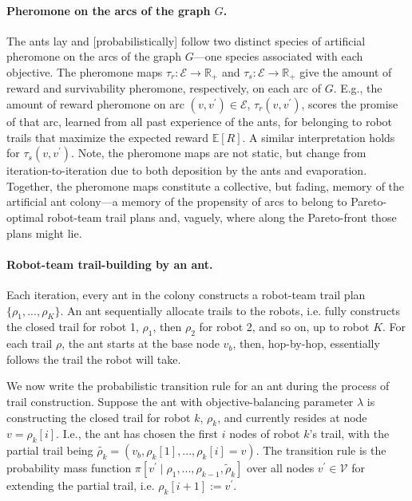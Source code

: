 \documentclass[11pt, oneside]{article}
\begin{document}
\paragraph{Pheromone on the arcs of the graph $G$.}
The ants lay and [probabilistically] follow two distinct species of artificial pheromone on the arcs of the graph $G$---one species associated with each objective. 
The pheromone maps $\tau_r:\mathcal{E}\rightarrow \mathbb{R}_+$ and $\tau_s:\mathcal{E}\rightarrow \mathbb{R}_+$ give the amount of reward and survivability pheromone, respectively, on each arc of $G$.
E.g., the amount of reward pheromone on arc $(v, v^\prime)\in\mathcal{E}$, $\tau_r(v, v^\prime)$, scores the promise of that arc, learned from all past experience of the ants, for belonging to robot trails that maximize the expected reward $\mathbb{E}[R]$. A similar interpretation holds for $\tau_s(v, v^\prime)$. 
Note, the pheromone maps are not static, but change from iteration-to-iteration due to both deposition by the ants and evaporation. 
Together, the pheromone maps constitute a collective, but fading, memory of the artificial ant colony---a memory of the propensity of arcs to belong to Pareto-optimal robot-team trail plans and, vaguely, where along the Pareto-front those plans might lie.

 
\paragraph{Robot-team trail-building by an ant.}
Each iteration, every ant in the colony constructs a robot-team trail plan $\{\rho_1, ..., \rho_K\}$.
An ant sequentially allocate trails to the robots, 
i.e. fully constructs the closed trail for robot 1, $\rho_1$, then $\rho_2$ for robot 2, and so on, up to robot $K$.
For each trail $\rho$, the ant starts at the base node $v_b$, then, hop-by-hop, essentially follows the trail the robot will take. 

We now write the probabilistic transition rule for an ant during the process of trail construction.
Suppose the ant with objective-balancing parameter $\lambda$ is constructing the closed trail for robot $k$, $\rho_k$, and currently resides at node $v=\rho_k[i]$.
I.e., the ant has chosen the first $i$ nodes of robot $k$'s trail, with the partial trail being $\tilde{\rho_k}=(v_b, \rho_k[1], ..., \rho_k[i]=v)$. 
The transition rule is the probability mass function $\pi[v^\prime \mid \rho_1, ..., \rho_{k-1}, \tilde{\rho}_k]$ over all nodes $v^\prime \in \mathcal{V}$ for extending the partial trail, i.e. $\rho_k[i+1]:=v^\prime$.
\end{document}
